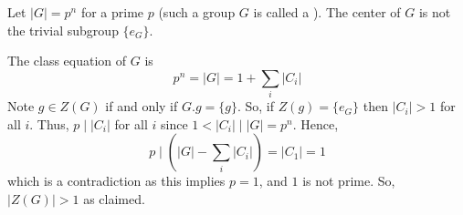 \documentclass[12pt, a4paper, twoside, openright, titlepage]{book}
\begin{document}
\begin{prop}{}{}
        Let $|G| = p^n$ for a prime $p$ (such a group $G$ is called a ). The center of $G$ is not the trivial subgroup $\{e_G\}$.
\end{prop}
\begin{proof*}{}{}
        The class equation of $G$ is \begin{equation}
                p^n = |G| = 1+\sum_i|C_i|
        \end{equation}
        Note $g \in Z(G)$ if and only if $G.g = \{g\}$. So, if $Z(g) = \{e_G\}$ then $|C_i| > 1$ for all $i$. Thus, $p\;\vert\;|C_i|$ for all $i$ since $1 < |C_i|\;\vert\;|G| = p^n$. Hence, \begin{equation}
                p\;\vert\;\left(|G|-\sum_i|C_i|\right) = |C_1| = 1
        \end{equation}
        which is a contradiction as this implies $p = 1$, and $1$ is not prime. So, $|Z(G)| > 1$ as claimed.
\end{proof*}
\end{document}
